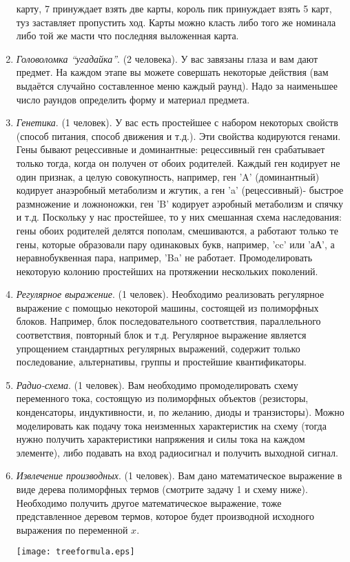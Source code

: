 \documentclass[12pt]{report}
\begin{document}
\begin{enumerate}
карту, 7  принуждает взять две карты, король пик  принуждает взять 5 карт, туз заставляет пропустить ход. Карты можно 
класть либо того же номинала либо той же масти что последняя выложенная карта.
  \item \emph{Головоломка ``угадайка''}. (2 человека). У вас завязаны глаза и вам дают предмет. На каждом этапе вы можете
  совершать некоторые действия (вам выдаётся случайно составленное меню каждый раунд). Надо за наименьшее число
  раундов определить форму и материал предмета. 
  \item \emph{Генетика}. (1 человек). У вас есть простейшее с набором некоторых свойств (способ питания, способ движения и т.д.). 
  Эти свойства кодируются генами.
  Гены бывают рецессивные и доминантные: рецессивный ген срабатывает только тогда, когда он получен от обоих родителей.
  Каждый ген кодирует не один признак, а целую совокупность, например, ген 'A' (доминантный) кодирует анаэробный метаболизм 
  и жгутик, а ген 'a' (рецессивный)- быстрое размножение и ложноножки, ген 'B' кодирует аэробный метаболизм и спячку и т.д.
  Поскольку у нас простейшее, то у них смешанная схема наследования: гены обоих родителей делятся пополам, смешиваются, а работают
  только те гены, которые образовали пару одинаковых букв, например, 'cc' или 'аА', а неравнобуквенная пара, например, 'Ba' не работает.
  Промоделировать некоторую колонию простейших на протяжении нескольких поколений.
  \item \emph{Регулярное выражение}. (1 человек). Необходимо реализовать регулярное выражение с помощью некоторой машины, состоящей из
  полиморфных блоков. Например, блок последовательного соответствия, параллельного соответствия, повторный блок и т.д. Регулярное
  выражение является упрощением стандартных регулярных выражений, содержит только последование, альтернативы, группы и простейшие
  квантификаторы.
  \item \emph{Радио-схема}. (1 человек). Вам необходимо промоделировать схему переменного тока, состоящую из полиморфных объектов (резисторы,
  конденсаторы, индуктивности, и, по желанию, диоды и транзисторы). Можно моделировать как подачу тока неизменных характеристик 
  на схему (тогда нужно получить характеристики напряжения и силы тока на каждом элементе), либо подавать на вход радиосигнал
  и получить выходной сигнал.
  \item \emph{Извлечение производных}. (1 человек). Вам дано математическое выражение в виде дерева полиморфных 
  термов (смотрите задачу 1 и схему ниже). Необходимо получить другое математическое выражение, тоже представленное деревом термов, которое будет
  производной исходного выражения по переменной $x$.
   \begin{center}
    \texttt{[image: treeformula.eps]}


\end{center}
\end{enumerate}
\end{document}
